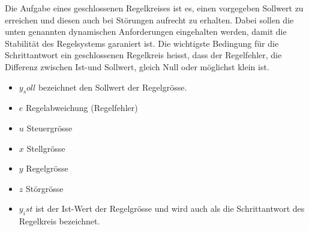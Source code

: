 Die    Aufgabe   eines    geschlossenen    Regelkreises ist  es, einen  vorgegeben Sollwert  zu erreichen  und diesen
auch bei  St\"orungen aufrecht zu  erhalten. Dabei sollen die  unten genannten
dynamischen  Anforderungen  eingehalten  werden, damit  die  Stabilit\"at  des
Regelsystems garaniert ist. Die wichtigste  Bedingung f\"ur die Schrittantwort
ein  geschlossenen  Regelkreis heisst,  dass  der  Regelfehler, die  Differenz
zwischen Ist-und Sollwert, gleich Null oder m\"oglichst klein ist.\\



\begin{itemize}
    \item
        $y_soll$ bezeichnet den Sollwert der Regelgr\"osse.
    \item
        $e$ Regelabweichung (Regelfehler)
    \item
        $u$ Steuergr\"osse
    \item
        $x$ Stellgr\"osse
    \item
        $y$ Regelgr\"osse
    \item
        $z$ St\"orgr\"osse
    \item
        $y_ist$  ist der  Ist-Wert der  Regelgr\"osse  und wird  auch als  die
        Schrittantwort des Regelkreis bezeichnet.
\end{itemize}


